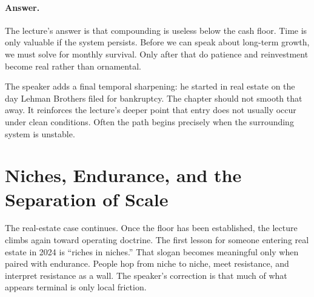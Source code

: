 \paragraph{Answer.} The lecture's answer is that compounding is useless below the cash floor. Time is only valuable if the system persists. Before we can speak about long-term growth, we must solve for monthly survival. Only after that do patience and reinvestment become real rather than ornamental.

\begin{figure}
\centering
{}
\end{figure}

The speaker adds a final temporal sharpening: he started in real estate on the day Lehman Brothers filed for bankruptcy. The chapter should not smooth that away. It reinforces the lecture's deeper point that entry does not usually occur under clean conditions. Often the path begins precisely when the surrounding system is unstable.

\section{Niches, Endurance, and the Separation of Scale}

The real-estate case continues. Once the floor has been established, the lecture climbs again toward operating doctrine. The first lesson for someone entering real estate in 2024 is ``riches in niches.'' That slogan becomes meaningful only when paired with endurance. People hop from niche to niche, meet resistance, and interpret resistance as a wall. The speaker's correction is that much of what appears terminal is only local friction.

